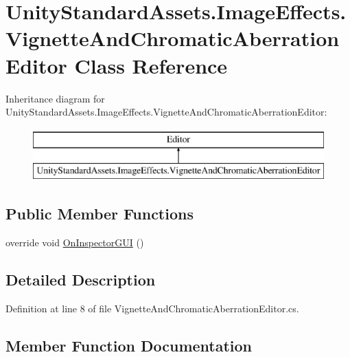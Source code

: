 \hypertarget{class_unity_standard_assets_1_1_image_effects_1_1_vignette_and_chromatic_aberration_editor}{}\section{Unity\+Standard\+Assets.\+Image\+Effects.\+Vignette\+And\+Chromatic\+Aberration\+Editor Class Reference}
\label{class_unity_standard_assets_1_1_image_effects_1_1_vignette_and_chromatic_aberration_editor}
Inheritance diagram for Unity\+Standard\+Assets.\+Image\+Effects.\+Vignette\+And\+Chromatic\+Aberration\+Editor\+:\begin{figure}[H]
\begin{center}
\leavevmode
\includegraphics[height=2.000000cm]{class_unity_standard_assets_1_1_image_effects_1_1_vignette_and_chromatic_aberration_editor}
\end{center}
\end{figure}
\subsection*{Public Member Functions}
\begin{DoxyCompactItemize}
\item 
override void \mbox{\hyperlink{class_unity_standard_assets_1_1_image_effects_1_1_vignette_and_chromatic_aberration_editor_a6e02d27bba07b14c97f49e620d81ea05}{On\+Inspector\+G\+UI}} ()
\end{DoxyCompactItemize}


\subsection{Detailed Description}


Definition at line 8 of file Vignette\+And\+Chromatic\+Aberration\+Editor.\+cs.



\subsection{Member Function Documentation}
\mbox{\label{class_unity_standard_assets_1_1_image_effects_1_1_vignette_and_chromatic_aberration_editor_a6e02d27bba07b14c97f49e620d81ea05}} 
